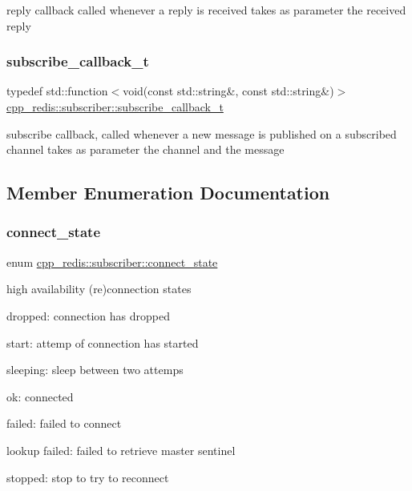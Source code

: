 reply callback called whenever a reply is received takes as parameter the received reply \mbox{\label{classcpp__redis_1_1subscriber_ac6ab8ebc526d784e4b79a39bbd73dca8}} 
\subsubsection{\texorpdfstring{subscribe\+\_\+callback\+\_\+t}{subscribe\_callback\_t}}
{\footnotesize\ttfamily typedef std\+::function$<$void(const std\+::string\&, const std\+::string\&)$>$ \hyperlink{classcpp__redis_1_1subscriber_ac6ab8ebc526d784e4b79a39bbd73dca8}{cpp\+\_\+redis\+::subscriber\+::subscribe\+\_\+callback\+\_\+t}}

subscribe callback, called whenever a new message is published on a subscribed channel takes as parameter the channel and the message 

\subsection{Member Enumeration Documentation}
\mbox{\label{classcpp__redis_1_1subscriber_afc976757efd9d0ac4def6935546a2338}} 
\subsubsection{\texorpdfstring{connect\+\_\+state}{connect\_state}}
{\footnotesize\ttfamily enum \hyperlink{classcpp__redis_1_1subscriber_afc976757efd9d0ac4def6935546a2338}{cpp\+\_\+redis\+::subscriber\+::connect\+\_\+state}\hspace{0.3cm}{\ttfamily [strong]}}

high availability (re)connection states
\begin{DoxyItemize}
\item dropped\+: connection has dropped
\item start\+: attemp of connection has started
\item sleeping\+: sleep between two attemps
\item ok\+: connected
\item failed\+: failed to connect
\item lookup failed\+: failed to retrieve master sentinel
\item stopped\+: stop to try to reconnect 
\end{DoxyItemize}

